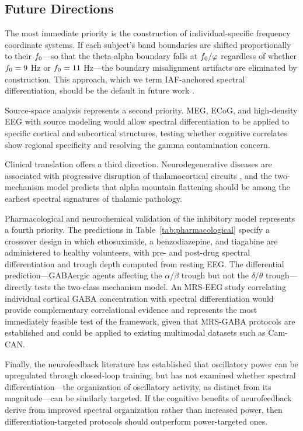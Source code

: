 \subsection{Future Directions}

The most immediate priority is the construction of individual-specific frequency coordinate systems. If each subject's band boundaries are shifted proportionally to their $f_0$---so that the theta-alpha boundary falls at $f_0 / \varphi$ regardless of whether $f_0 = 9$ Hz or $f_0 = 11$ Hz---the boundary misalignment artifacts are eliminated by construction. This approach, which we term IAF-anchored spectral differentiation, should be the default in future work \parencite{corcoran2018iaf,klimesch1999eeg}.

Source-space analysis represents a second priority. MEG, ECoG, and high-density EEG with source modeling would allow spectral differentiation to be applied to specific cortical and subcortical structures, testing whether cognitive correlates show regional specificity and resolving the gamma contamination concern.

Clinical translation offers a third direction. Neurodegenerative diseases are associated with progressive disruption of thalamocortical circuits \parencite{klimesch2018frequency}, and the two-mechanism model predicts that alpha mountain flattening should be among the earliest spectral signatures of thalamic pathology.

Pharmacological and neurochemical validation of the inhibitory model represents a fourth priority. The predictions in Table~\ref{tab:pharmacological} specify a crossover design in which ethosuximide, a benzodiazepine, and tiagabine are administered to healthy volunteers, with pre- and post-drug spectral differentiation and trough depth computed from resting EEG. The differential prediction---GABAergic agents affecting the $\alpha$/$\beta$ trough but not the $\delta$/$\theta$ trough---directly tests the two-class mechanism model. An MRS-EEG study correlating individual cortical GABA concentration with spectral differentiation would provide complementary correlational evidence and represents the most immediately feasible test of the framework, given that MRS-GABA protocols are established \parencite{edden2012gaba} and could be applied to existing multimodal datasets such as Cam-CAN.

Finally, the neurofeedback literature has established that oscillatory power can be upregulated through closed-loop training, but has not examined whether spectral differentiation---the organization of oscillatory activity, as distinct from its magnitude---can be similarly targeted. If the cognitive benefits of neurofeedback derive from improved spectral organization rather than increased power, then differentiation-targeted protocols should outperform power-targeted ones.
